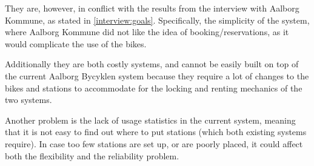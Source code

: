 They are, however, in conflict with the results from the interview with Aalborg Kommune, as stated in \cref{interview:goals}.
Specifically, the simplicity of the system, where Aalborg Kommune did not like the idea of booking/reservations, as it would complicate the use of the bikes.

Additionally they are both costly systems, and cannot be easily built on top of the current Aalborg Bycyklen system because they require a lot of changes to the bikes and stations to accommodate for the locking and renting mechanics of the two systems.

Another problem is the lack of usage statistics in the current system, meaning that it is not easy to find out where to put stations (which both existing systems require).
In case too few stations are set up, or are poorly placed, it could affect both the flexibility and the reliability problem.
